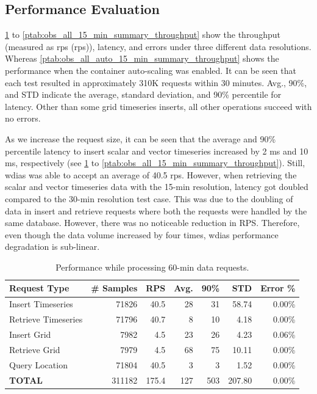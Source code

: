 \documentclass[conference]{IEEEtran}
\begin{document}
\subsection{Performance Evaluation}
\label{psubse:performance_evaluation}

\cref{ptab:obs_all_60_min_summary_throughput} to \cref{ptab:obs_all_15_min_summary_throughput} show the throughput (measured as \acrlong{rps} (\acrshort{rps})), latency, and errors under three different data resolutions. Whereas \cref{ptab:obs_all_auto_15_min_summary_throughput} shows the performance when the container auto-scaling was enabled. It can be seen that each test resulted in approximately 310K requests within 30 minutes. Avg., 90\%, and STD indicate the average, standard deviation, and 90\% percentile for latency. Other than some grid timeseries inserts, all other operations succeed with no errors.

As we increase the request size, it can be seen that the average and 90\% percentile latency to insert scalar and vector timeseries increased by 2 ms and 10 ms, respectively (see  \cref{ptab:obs_all_60_min_summary_throughput} to \cref{ptab:obs_all_15_min_summary_throughput}). Still, \acrshort{wdias} was able to accept an average of 40.5 \acrshort{rps}. However, when retrieving the scalar and vector timeseries data with the 15-min resolution, latency got doubled compared to the 30-min resolution test case. This was due to the doubling of data in insert and retrieve requests where both the requests were handled by the same database. However, there was no noticeable reduction in RPS. Therefore, even though the data volume increased by four times, \acrshort{wdias} performance degradation is sub-linear. 


\begin{table}[tb!]
\centering
\caption{Performance while processing 60-min data requests.}
\begin{adjustbox}{width=0.45\textwidth}
\begin{tabular}{|l|r|r|r|r|r|r|}
\hline
\textbf{Request Type} & \textbf{\# Samples} & \textbf{RPS} & \textbf{Avg.} & \textbf{90\%} & \textbf{STD} & \textbf{Error \%} \\ \hline
Insert Timeseries & 71826 & 40.5 & 28 & 31 & 58.74 & 0.00\% \\ \hline
Retrieve Timeseries & 71796 & 40.7 & 8 & 10 & 4.18 & 0.00\% \\ \hline
Insert Grid & 7982 & 4.5 & 23 & 26 & 4.23 & 0.06\% \\ \hline
Retrieve Grid & 7979 & 4.5 & 68 & 75 & 10.11 & 0.00\% \\ \hline
Query Location & 71804 & 40.5 & 3 & 3 & 1.52 & 0.00\% \\ \hline
\textbf{TOTAL} & 311182 & 175.4 & 127 & 503 & 207.80 & 0.00\% \\ \hline
\end{tabular}
\end{adjustbox}
\label{ptab:obs_all_60_min_summary_throughput}
\end{table}
\end{document}
